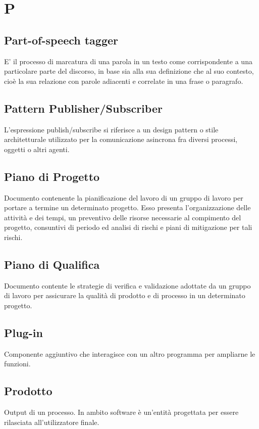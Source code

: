 \section*{P}

\subsection{Part-of-speech tagger}
E' il processo di marcatura di una parola in un testo come corrispondente a una particolare parte del discorso, in base sia alla sua definizione che al suo contesto, cioè la sua relazione con parole adiacenti e correlate in una frase o paragrafo.

\subsection{Pattern Publisher/Subscriber} 
L'espressione publish/subscribe si riferisce a un design pattern o stile architetturale utilizzato per la comunicazione asincrona fra diversi processi, oggetti o altri agenti.
 
\subsection{Piano di Progetto}
Documento contenente la pianificazione del lavoro di un gruppo di lavoro per portare a termine un determinato progetto. Esso presenta l'organizzazione delle attività e dei tempi, un preventivo delle risorse necessarie al compimento del progetto, consuntivi di periodo ed analisi di rischi e piani di mitigazione per tali rischi.

\subsection{Piano di Qualifica}
Documento contente le strategie di verifica e validazione adottate da un gruppo di lavoro per assicurare la qualità di prodotto e di processo in un determinato progetto.

\subsection{Plug-in} 
Componente aggiuntivo che interagisce con un altro programma per ampliarne le funzioni.

\subsection{Prodotto}
Output di un processo. In ambito software è un'entità progettata per essere rilasciata all'utilizzatore finale.

